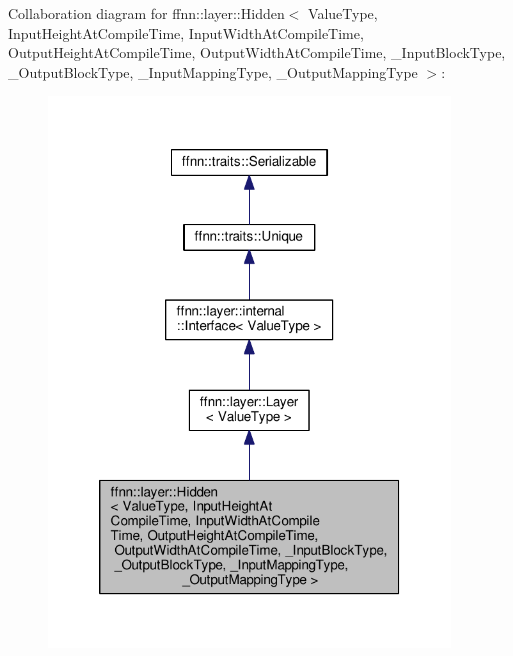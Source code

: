 Collaboration diagram for ffnn\-:\-:layer\-:\-:Hidden$<$ Value\-Type, Input\-Height\-At\-Compile\-Time, Input\-Width\-At\-Compile\-Time, Output\-Height\-At\-Compile\-Time, Output\-Width\-At\-Compile\-Time, \-\_\-\-Input\-Block\-Type, \-\_\-\-Output\-Block\-Type, \-\_\-\-Input\-Mapping\-Type, \-\_\-\-Output\-Mapping\-Type $>$\-:\nopagebreak
\begin{figure}[H]
\begin{center}
\leavevmode
\includegraphics[width=302pt]{classffnn_1_1layer_1_1_hidden__coll__graph}
\end{center}
\end{figure}

